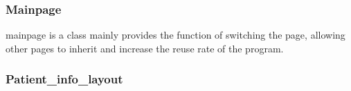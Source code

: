 \documentclass{article}
\begin{document}
\subsubsection*{Mainpage}
mainpage is a class mainly provides the function of 
switching the page, allowing other pages to inherit 
and increase the reuse rate of the program.

\subsubsection*{Patient\_info\_layout}
\end{document}
